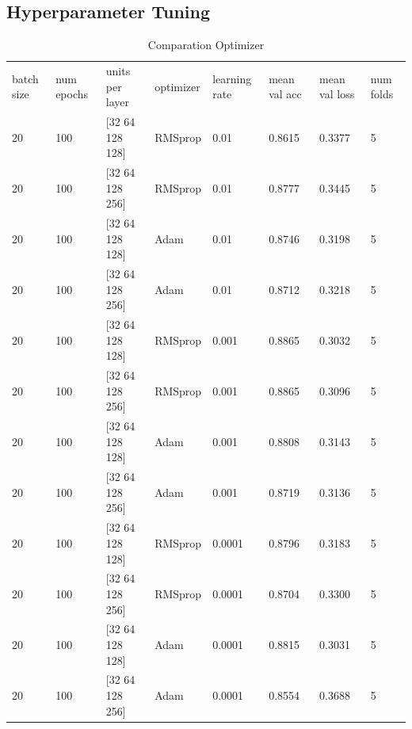 \documentclass{book}
\begin{document}
            \subsection{Hyperparameter Tuning}

            \begin{table}
                \begin{center}
                    \begin{tabular}{m{1cm}m{1cm}m{2.5cm}m{1.3cm}m{1cm}m{2cm}m{2cm}m{1cm}}
                        \midrule
                        batch size	& num epochs	& units per layer	& optimizer	& learning rate	& mean val acc	& mean val loss	& num folds \\
                        20	& 100	& [32  64  128  128]	& RMSprop	& 0.01	& 0.8615 & 0.3377 & 5 \\
                        \midrule
                        20	& 100	& [32  64  128  256]	& RMSprop	& 0.01	& 0.8777 & 0.3445 & 5 \\
                        \midrule
                        20	& 100	& [32  64  128  128]	& Adam	& 0.01	& 0.8746 & 0.3198 & 5 \\
                        \midrule
                        20	& 100	& [32  64  128  256]	& Adam	& 0.01	& 0.8712 & 0.3218 & 5 \\
                        \midrule
                        20	& 100	& [32  64  128  128]	& RMSprop	& 0.001	& 0.8865 & 0.3032 & 5 \\
                        \midrule
                        20	& 100	& [32  64  128  256]	& RMSprop	& 0.001	& 0.8865 & 0.3096 & 5 \\
                        \midrule
                        20	& 100	& [32  64  128  128]	& Adam	& 0.001	& 0.8808 & 0.3143 & 5 \\
                        \midrule
                        20	& 100	& [32  64  128  256]	& Adam	& 0.001	& 0.8719 & 0.3136 & 5 \\
                        \midrule
                        20	& 100	& [32  64  128  128]	& RMSprop	& 0.0001	& 0.8796 & 0.3183 & 5 \\
                        \midrule
                        20	& 100	& [32  64  128  256]	& RMSprop	& 0.0001	& 0.8704 & 0.3300 & 5 \\
                        \midrule
                        20	& 100	& [32  64  128  128]	& Adam	& 0.0001	& 0.8815 & 0.3031 & 5 \\
                        \midrule
                        20	& 100	& [32  64  128  256]	& Adam	& 0.0001	& 0.8554 & 0.3688 & 5 \\
                        \midrule
                    \end{tabular}
                \end{center}
                \caption{\label{tab:optimizer}Comparation Optimizer}
            \end{table}
\end{document}
